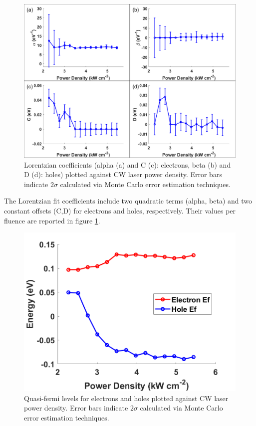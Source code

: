 \documentclass[aps,prl,preprint,superscriptaddress]{revtex4-2}
\begin{document}
\begin{figure}[H]
	\includegraphics[width=1\linewidth]{fig_alphabetaCD.png}
	\caption{Lorentzian coefficients (alpha (a) and C (c): electrons, beta (b) and D (d): holes) plotted against CW laser power density. Error bars indicate $2\sigma$ calculated via Monte Carlo error estimation techniques.}
	\label{fig:alphabetaCD}
\end{figure}

The Lorentzian fit coefficients include two quadratic terms (alpha, beta) and two constant offsets (C,D) for electrons and holes, respectively. Their values per fluence are reported in figure \ref{fig:alphabetaCD}.

\begin{figure}[H]
	\begin{centering}
		\includegraphics[width=0.5\linewidth]{fermilevelvfluence.png}
		\caption{Quasi-fermi levels for electrons and holes plotted against CW laser power density. Error bars indicate $2\sigma$ calculated via Monte Carlo error estimation techniques.}
		\label{fig:fermilevelvfluence}
	\end{centering}
\end{figure}
\end{document}
